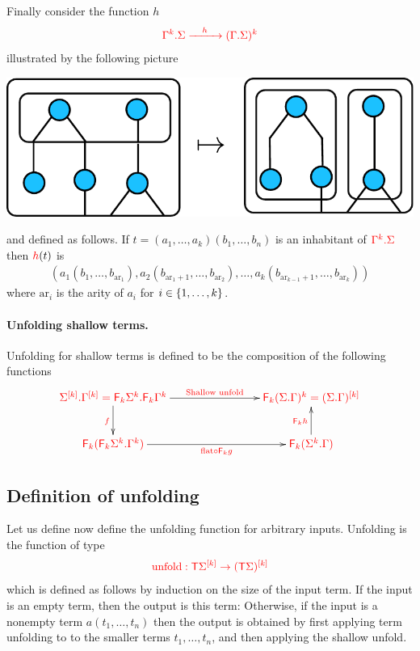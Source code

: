 Finally consider the function $h$
\begin{align*}
\ranked{\shallowterm  {\Gamma^k} {\Sigma} \xrightarrow{\quad h\quad} (\shallowterm  \Gamma  \Sigma)^k} 
\end{align*}
illustrated by the following picture  
\begin{center}
{\includegraphics[scale=.4]{pictures/tensor-shallow-distrib}}
\end{center}
and defined as follows. If $t=(a_1,\dots,a_k)(b_1,\dots,b_n)$ is an inhabitant of $\ranked{\shallowterm  {\Gamma^k} {\Sigma}}$ then $\ranked{h}(t)$ is
\begin{align*}
(a_1(b_1,\dots,b_{\text{ar}_1}), a_2(b_{\text{ar}_1+1},\dots,b_{\text{ar}_2}),\dots ,a_k(b_{\text{ar}_{k-1}+1},\dots,b_{\text{ar}_k}))
\end{align*} 
where $\text{ar}_i$ is the arity of $a_i$ for $i\in\set{1,\dots,k}$.

\paragraph*{Unfolding shallow terms.} Unfolding for shallow terms is defined to be  the composition of the following functions
  \begin{align*}
  \xymatrix@C=2.8cm{
          \ranked{\shallowterm{\mati k \rSigma} {\mati k \rGamma} = {\shallowterm{\reduce k {\Sigma^k}}{\reduce k {\Gamma^k}}} 
        \ar[d]_{\ranked{\substack{f}}}
        \ar[r]^-{\ranked{\text{Shallow unfold}}}}
        &
        \ranked{ \reduce k(\shallowterm{\Sigma}{ {\Gamma}})^k = \mati k {(\shallowterm \Sigma \Gamma)}}
        \\
       \ranked{  \reduce k(\shallowterm{\reduce k {\Sigma^k}}{ {\Gamma^k}})}
        \ar[r]_-{\ranked{\flatt\circ \reduce k g}}
        &
    \ranked{   \reduce k(\shallowterm{\Sigma^k}{ {\Gamma}}) } \ar[u]^{\ranked{\reduce k  h}}
    } 
\end{align*}    

\subsection{Definition of unfolding}
Let us define now define the unfolding function for arbitrary inputs.
Unfolding is the function of type 
\begin{align*}
    \ranked{\unfold : \tmonad \mati k \rSigma \to \mati k {(\tmonad \Sigma)} }
    \end{align*}
    which  is defined as follows by induction on the size of the input term. If the input is an empty term, then the output is this term:
Otherwise, if the input is a nonempty term $a(t_1,\ldots,t_n)$ then the output is obtained by first applying term unfolding to to the smaller terms $t_1,\ldots,t_n$, and then applying the shallow unfold. 